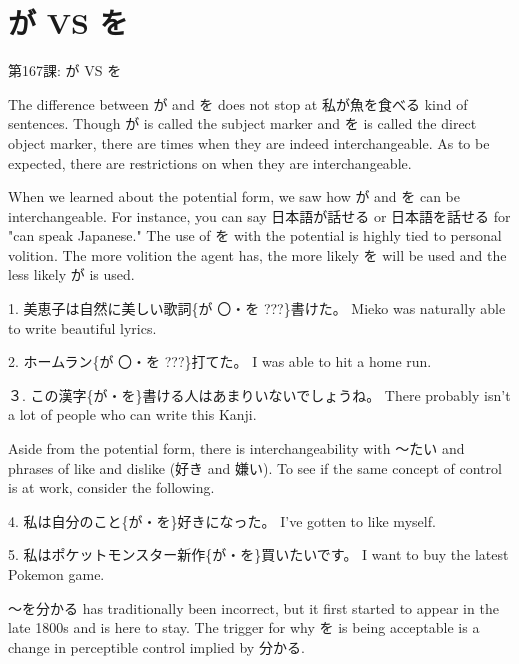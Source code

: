     
\chapter{が VS を}

\begin{center}
\begin{Large}
第167課: が VS を 
\end{Large}
\end{center}
 
\par{ The difference between が and を does not stop at 私が魚を食べる kind of sentences. Though が is called the subject marker and を is called the direct object marker, there are times when they are indeed interchangeable. As to be expected, there are restrictions on when they are interchangeable. }

\par{ When we learned about the potential form, we saw how が and を can be interchangeable. For instance, you can say 日本語が話せる or 日本語を話せる for "can speak Japanese." The use of を with the potential is highly tied to personal volition. The more volition the agent has, the more likely を will be used and the less likely が is used. }

\par{1. 美恵子は自然に美しい歌詞\{が 〇・を ???\}書けた。 \hfill\break
Mieko was naturally able to write beautiful lyrics. }

\par{2. ホームラン\{が 〇・を ???\}打てた。 \hfill\break
I was able to hit a home run. }

\par{３. この漢字\{が・を\}書ける人はあまりいないでしょうね。 \hfill\break
There probably isn't a lot of people who can write this Kanji.  }

\par{ Aside from the potential form, there is interchangeability with ～たい and phrases of like and dislike (好き and 嫌い). To see if the same concept of control is at work, consider the following. }

\par{4. 私は自分のこと\{が・を\}好きになった。 \hfill\break
I've gotten to like myself. }

\par{5. 私はポケットモンスター新作\{が・を\}買いたいです。 \hfill\break
I want to buy the latest Pokemon game. }

\par{ ～を分かる has traditionally been incorrect, but it first started to appear in the late 1800s and is here to stay. The trigger for why を is being acceptable is a change in perceptible control implied by 分かる. }

